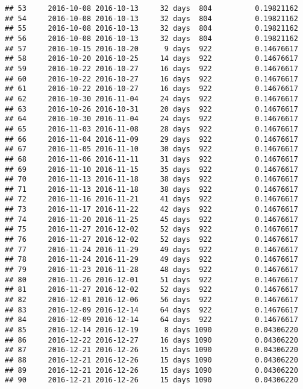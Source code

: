\documentclass[]{article}
\begin{document}
\begin{verbatim}
## 53     2016-10-08 2016-10-13     32 days  804          0.19821162
## 54     2016-10-08 2016-10-13     32 days  804          0.19821162
## 55     2016-10-08 2016-10-13     32 days  804          0.19821162
## 56     2016-10-08 2016-10-13     32 days  804          0.19821162
## 57     2016-10-15 2016-10-20      9 days  922          0.14676617
## 58     2016-10-20 2016-10-25     14 days  922          0.14676617
## 59     2016-10-22 2016-10-27     16 days  922          0.14676617
## 60     2016-10-22 2016-10-27     16 days  922          0.14676617
## 61     2016-10-22 2016-10-27     16 days  922          0.14676617
## 62     2016-10-30 2016-11-04     24 days  922          0.14676617
## 63     2016-10-26 2016-10-31     20 days  922          0.14676617
## 64     2016-10-30 2016-11-04     24 days  922          0.14676617
## 65     2016-11-03 2016-11-08     28 days  922          0.14676617
## 66     2016-11-04 2016-11-09     29 days  922          0.14676617
## 67     2016-11-05 2016-11-10     30 days  922          0.14676617
## 68     2016-11-06 2016-11-11     31 days  922          0.14676617
## 69     2016-11-10 2016-11-15     35 days  922          0.14676617
## 70     2016-11-13 2016-11-18     38 days  922          0.14676617
## 71     2016-11-13 2016-11-18     38 days  922          0.14676617
## 72     2016-11-16 2016-11-21     41 days  922          0.14676617
## 73     2016-11-17 2016-11-22     42 days  922          0.14676617
## 74     2016-11-20 2016-11-25     45 days  922          0.14676617
## 75     2016-11-27 2016-12-02     52 days  922          0.14676617
## 76     2016-11-27 2016-12-02     52 days  922          0.14676617
## 77     2016-11-24 2016-11-29     49 days  922          0.14676617
## 78     2016-11-24 2016-11-29     49 days  922          0.14676617
## 79     2016-11-23 2016-11-28     48 days  922          0.14676617
## 80     2016-11-26 2016-12-01     51 days  922          0.14676617
## 81     2016-11-27 2016-12-02     52 days  922          0.14676617
## 82     2016-12-01 2016-12-06     56 days  922          0.14676617
## 83     2016-12-09 2016-12-14     64 days  922          0.14676617
## 84     2016-12-09 2016-12-14     64 days  922          0.14676617
## 85     2016-12-14 2016-12-19      8 days 1090          0.04306220
## 86     2016-12-22 2016-12-27     16 days 1090          0.04306220
## 87     2016-12-21 2016-12-26     15 days 1090          0.04306220
## 88     2016-12-21 2016-12-26     15 days 1090          0.04306220
## 89     2016-12-21 2016-12-26     15 days 1090          0.04306220
## 90     2016-12-21 2016-12-26     15 days 1090          0.04306220

\end{verbatim}
\end{document}
